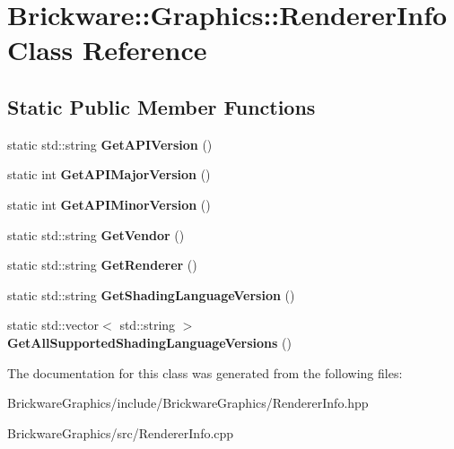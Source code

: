 \hypertarget{classBrickware_1_1Graphics_1_1RendererInfo}{}\section{Brickware\+:\+:Graphics\+:\+:Renderer\+Info Class Reference}
\label{classBrickware_1_1Graphics_1_1RendererInfo}
\subsection*{Static Public Member Functions}
\begin{DoxyCompactItemize}
\item 
\hypertarget{classBrickware_1_1Graphics_1_1RendererInfo_a4c38f1e7ffa71e639c01dddc95538488}{}static std\+::string {\bfseries Get\+A\+P\+I\+Version} ()\label{classBrickware_1_1Graphics_1_1RendererInfo_a4c38f1e7ffa71e639c01dddc95538488}

\item 
\hypertarget{classBrickware_1_1Graphics_1_1RendererInfo_a39286a66f12612569f63f75f02ea0a7f}{}static int {\bfseries Get\+A\+P\+I\+Major\+Version} ()\label{classBrickware_1_1Graphics_1_1RendererInfo_a39286a66f12612569f63f75f02ea0a7f}

\item 
\hypertarget{classBrickware_1_1Graphics_1_1RendererInfo_a7d7795d0d1ad7cf7e92758a51301d4b9}{}static int {\bfseries Get\+A\+P\+I\+Minor\+Version} ()\label{classBrickware_1_1Graphics_1_1RendererInfo_a7d7795d0d1ad7cf7e92758a51301d4b9}

\item 
\hypertarget{classBrickware_1_1Graphics_1_1RendererInfo_a4ef68472842715cce50a6fe920e65918}{}static std\+::string {\bfseries Get\+Vendor} ()\label{classBrickware_1_1Graphics_1_1RendererInfo_a4ef68472842715cce50a6fe920e65918}

\item 
\hypertarget{classBrickware_1_1Graphics_1_1RendererInfo_ac23ae2342385bfc3e68fdf85235868b2}{}static std\+::string {\bfseries Get\+Renderer} ()\label{classBrickware_1_1Graphics_1_1RendererInfo_ac23ae2342385bfc3e68fdf85235868b2}

\item 
\hypertarget{classBrickware_1_1Graphics_1_1RendererInfo_a403b4e8af406ee388c2abecbf24e3b19}{}static std\+::string {\bfseries Get\+Shading\+Language\+Version} ()\label{classBrickware_1_1Graphics_1_1RendererInfo_a403b4e8af406ee388c2abecbf24e3b19}

\item 
\hypertarget{classBrickware_1_1Graphics_1_1RendererInfo_a4979f6af91596829a3963cc214527bf2}{}static std\+::vector$<$ std\+::string $>$ {\bfseries Get\+All\+Supported\+Shading\+Language\+Versions} ()\label{classBrickware_1_1Graphics_1_1RendererInfo_a4979f6af91596829a3963cc214527bf2}

\end{DoxyCompactItemize}


The documentation for this class was generated from the following files\+:\begin{DoxyCompactItemize}
\item 
Brickware\+Graphics/include/\+Brickware\+Graphics/Renderer\+Info.\+hpp\item 
Brickware\+Graphics/src/Renderer\+Info.\+cpp\end{DoxyCompactItemize}
